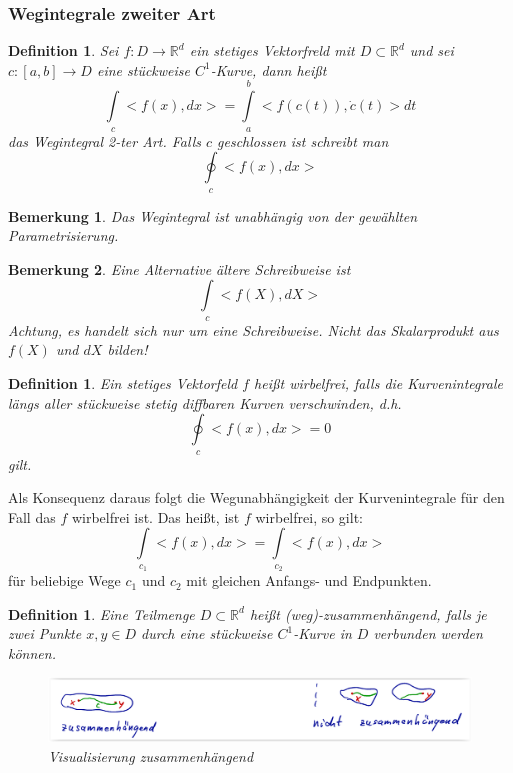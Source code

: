 \documentclass[12pt,a4paper]{article}%
\newtheorem{definition}[satz]{Definition}
\newtheorem{bem}{Bemerkung}[section]
\numberwithin{equation}{section}
\newcommand{\R}{\mathbb{R}} %
\numberwithin{equation}{subsection}
\begin{document}
		\subsubsection{Wegintegrale zweiter Art}
		\begin{definition}
		  Sei $f: D\rightarrow \R^d$ ein stetiges Vektorfreld mit $D\subset \R^d$ und sei $c:[a,b] \rightarrow D$ eine stückweise $C^1$-Kurve, dann heißt 
		  \begin{equation}
		    \int\limits_c <f(x), dx> = \int\limits_a^b <f\left(c(t)\right), \dot{c}(t)>dt
		  \end{equation}
		  das Wegintegral 2-ter Art. Falls $c$ geschlossen ist schreibt man
		  \begin{equation}
		    \oint\limits_c <f(x), dx>
		  \end{equation}
		\end{definition}
		\begin{bem}
		  Das Wegintegral ist unabhängig von der gewählten Parametrisierung.
		\end{bem}
		\begin{bem}
		  Eine Alternative ältere Schreibweise ist
		  \begin{equation*}
		    \int\limits_c <f(X),dX>
		  \end{equation*}
		  Achtung, es handelt sich nur um eine Schreibweise. Nicht das Skalarprodukt aus $f(X)$ und $dX$ bilden!
		\end{bem}
		\begin{definition}
  		Ein stetiges Vektorfeld $f$ heißt wirbelfrei, falls die Kurvenintegrale längs aller stückweise stetig diffbaren Kurven verschwinden, d.h.
  		\begin{equation}
  		  \oint\limits_c <f(x), dx> = 0
  		\end{equation}
  		gilt.
		\end{definition}
		Als Konsequenz daraus folgt die Wegunabhängigkeit der Kurvenintegrale für den Fall das $f$ wirbelfrei ist. Das heißt, ist $f$ wirbelfrei, so gilt:
		\begin{equation}
		  \int\limits_{c_1} <f(x),dx> = \int\limits_{c_2} <f(x),dx>
		\end{equation}
		für beliebige Wege $c_1$ und $c_2$ mit gleichen Anfangs- und Endpunkten.
		\begin{definition}
		  Eine Teilmenge $D \subset \R^d$ heißt (weg)-zusammenhängend, falls je zwei Punkte $x,y \in D$ durch eine stückweise $C^1$-Kurve in $D$ verbunden werden können.
		  \begin{figure}[H] 
			  \centering
			  \includegraphics[width=0.8\linewidth]{zusammenhaengend.png}
			  \caption{Visualisierung zusammenhängend \protect\cite{HM12}}
			  \label{fig:zusammenhängend}
		  \end{figure}
		\end{definition}
\end{document}
